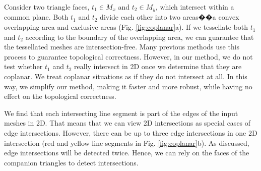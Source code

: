 
Consider two triangle faces,  $t_1\in M_x$ and $t_2 \in M_y$, which intersect within a common plane. Both $t_1$ and $t_2$ divide each other into two areas��a convex overlapping area and exclusive areas (Fig. \ref{fig:coplanar}a). If we tessellate both $t_1$ and $t_2$ according to the boundary of the overlapping area, we can guarantee that the tessellated meshes are intersection-free. Many previous methods \cite{feito2013fast,zhou2016mesh} use this process to guarantee topological correctness. However, in our method, we do not test whether $t_1$ and $t_2$ really intersect in 2D once we determine that they are coplanar. We treat coplanar situations as if they do not intersect at all. In this way, we simplify our method, making it faster and more robust, while having no effect on the topological correctness.


We find that each intersecting line segment is part of the edges of the input meshes in 2D. That means that we can view 2D intersections as special cases of edge intersections. However, there can be up to three edge intersections in one 2D intersection (red and yellow line segments in Fig. \ref{fig:coplanar}b). As discussed, edge intersections will be detected twice. Hence, we can rely on the faces of the companion triangles to detect intersections.

